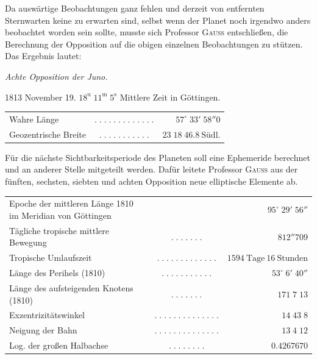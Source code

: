 \par\indent Da auswärtige Beobachtungen ganz fehlen und derzeit von entfernten Sternwarten keine zu erwarten sind, selbst wenn der Planet noch irgendwo anders beobachtet worden sein sollte, musste sich Professor \textsc{Gauss} entschließen, die Berechnung der Opposition auf die obigen einzelnen Beobachtungen zu stützen. Das Ergebnis lautet:
\begin{center}\leavevmode{}\emph{Achte Opposition der Juno.}\end{center}
\begin{center}1813 November 19. $18^{\mathrm u}\;11^{\mathrm m}\;5^{\mathrm s}$ Mittlere Zeit in Göttingen.\end{center}
\begin{center}\fontsize{10}{12}\selectfont\setlength{\tabcolsep}{2pt}\renewcommand{\arraystretch}{1.15}\begin{tabular}{lcr}
Wahre Länge & $.\;.\;.\;.\;.\;.\;.\;.\;.\;.\;.\;.\;.$ & $57^\circ\;33'\;58''0$\\
Geozentrische Breite & $.\;.\;.\;.\;.\;.\;.\;.\;.\;.\;.$ & $23\;18\;46.8\ \text{Südl.}$\\
\end{tabular}\end{center}
\par\indent Für die nächste Sichtbarkeitsperiode des Planeten soll eine Ephemeride berechnet und an anderer Stelle mitgeteilt werden. Dafür leitete Professor \textsc{Gauss} aus der fünften, sechsten, siebten und achten Opposition neue elliptische Elemente ab.
\begin{center}\fontsize{9}{11}\selectfont\setlength{\tabcolsep}{2pt}\renewcommand{\arraystretch}{1.15}\begin{tabular}{lcr}
\shortstack[l]{Epoche der mittleren Länge 1810\\im Meridian von Göttingen} &  & $95^\circ\;29'\;56''$\\
Tägliche tropische mittlere Bewegung & $.\;.\;.\;.\;.\;.\;.$ & $812''709$\\
Tropische Umlaufszeit & $.\;.\;.\;.\;.\;.\;.\;.\;.\;.\;.\;.\;.$ & $1594\ \text{Tage}\ 16\ \text{Stunden}$\\
Länge des Perihels (1810) & $.\;.\;.\;.\;.\;.\;.\;.\;.\;.\;.$ & $53^\circ\;6'\;40''$\\
Länge des aufsteigenden Knotens (1810) & $.\;.\;.\;.\;.\;.\;.$ & $171\;7\;13$\\
Exzentrizitätswinkel & $.\;.\;.\;.\;.\;.\;.\;.\;.\;.\;.\;.\;.\;.$ & $14\;43\;8$\\
Neigung der Bahn & $.\;.\;.\;.\;.\;.\;.\;.\;.\;.\;.\;.\;.\;.$ & $13\;4\;12$\\
Log. der großen Halbachse & $.\;.\;.\;.\;.\;.\;.\;.$ & $0.4267670$\\
\end{tabular}\end{center}
